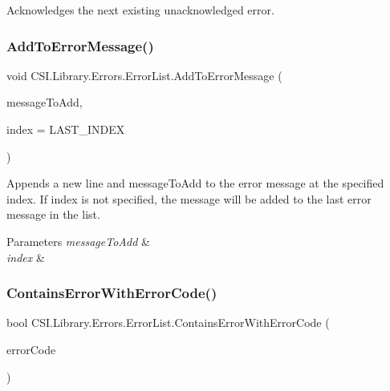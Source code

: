 Acknowledges the next existing unacknowledged error. 

\mbox{\label{class_c_s_i_1_1_library_1_1_errors_1_1_error_list_a0a74d769a7bb1ac855490f1d02c5fceb}} 
\subsubsection{\texorpdfstring{AddToErrorMessage()}{AddToErrorMessage()}}
{\footnotesize\ttfamily void C\+S\+I.\+Library.\+Errors.\+Error\+List.\+Add\+To\+Error\+Message (\begin{DoxyParamCaption}\item[{string}]{message\+To\+Add,  }\item[{int}]{index = {\ttfamily LAST\+\_\+INDEX} }\end{DoxyParamCaption})\hspace{0.3cm}{\ttfamily [inline]}}



Appends a new line and message\+To\+Add to the error message at the specified index. If index is not specified, the message will be added to the last error message in the list. 


\begin{DoxyParams}{Parameters}
{\em message\+To\+Add} & \\
\hline
{\em index} & \\
\hline
\end{DoxyParams}
\mbox{\label{class_c_s_i_1_1_library_1_1_errors_1_1_error_list_a476d28bd130fefa2fcdf73acd4552646}} 
\subsubsection{\texorpdfstring{ContainsErrorWithErrorCode()}{ContainsErrorWithErrorCode()}}
{\footnotesize\ttfamily bool C\+S\+I.\+Library.\+Errors.\+Error\+List.\+Contains\+Error\+With\+Error\+Code (\begin{DoxyParamCaption}\item[{\mbox{\hyperlink{namespace_c_s_i_1_1_library_1_1_errors_a5534735de1ef2256eb4c52c7440e30d7}{Enum\+Error\+Codes}}}]{error\+Code }\end{DoxyParamCaption})\hspace{0.3cm}{\ttfamily [inline]}}




